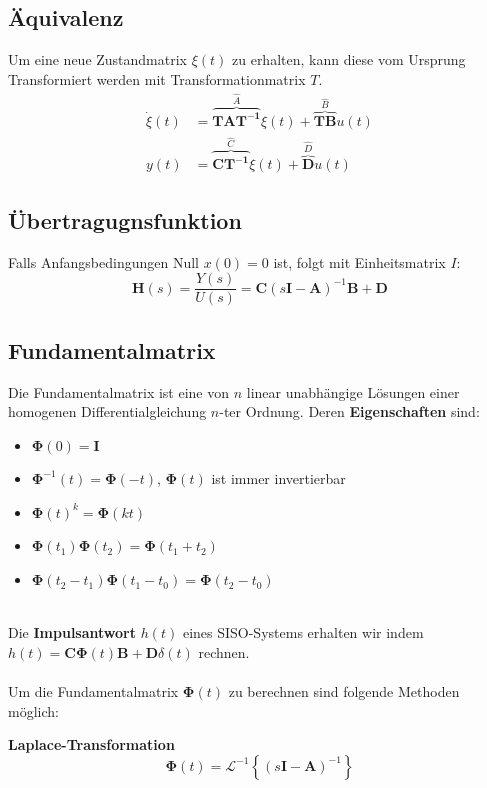 \subsection{Äquivalenz}
Um eine neue Zustandmatrix $\xi(t)$ zu erhalten, kann diese vom Ursprung Transformiert werden mit Transformationmatrix $T$.
\begin{align*}
	\dot{\xi}(t) &= \overbrace{\mathbf{TAT^{-1}}}^{\hat{A}} \xi(t) + \overbrace{\mathbf{TB}}^{\hat{B}} u(t)\\
	y(t) &= \overbrace{\mathbf{CT^{-1}}}^{\hat{C}}\xi(t) + \overbrace{\mathbf{D}}^{\hat{D}}u(t)
\end{align*}


\subsection{Übertragugnsfunktion}
Falls Anfangsbedingungen Null $x(0) = 0$ ist, folgt mit Einheitsmatrix $I$:
\[
\mathbf{H}(s) = \frac{Y(s)}{U(s)} = \mathbf{C}(s\mathbf{I} - \mathbf{A})^{-1}\mathbf{B} + \mathbf{D}
\]

\subsection{Fundamentalmatrix}
Die Fundamentalmatrix ist eine von $n$ linear unabhängige Lösungen einer homogenen Differentialgleichung $n$-ter Ordnung. Deren \textbf{Eigenschaften} sind:
\begin{itemize}[nosep]
	\item $\mathbf{\Phi}(0)  = \mathbf{I}$
	\item $\mathbf{\Phi}^{-1}(t) = \mathbf{\Phi}(-t)$, $\mathbf{\Phi}(t)$ ist immer invertierbar
	\item $\mathbf{\Phi}(t)^{k} = \mathbf{\Phi}(kt)$
	\item $\mathbf{\Phi}(t_1)\mathbf{\Phi}(t_2) = \mathbf{\Phi}(t_1 + t_2)$
	\item $\mathbf{\Phi}(t_2 - t_1)\mathbf{\Phi}(t_1 - t_0) = \mathbf{\Phi}(t_2 - t_0)$
\end{itemize}
~\\
Die \textbf{Impulsantwort} $h(t)$ eines SISO-Systems erhalten wir indem $h(t) = \mathbf{C}\mathbf{\Phi}(t)\mathbf{B} + \mathbf{D}\delta(t)$ rechnen.
~\\~\\
Um die Fundamentalmatrix $\mathbf{\Phi}(t)$ zu berechnen sind folgende Methoden möglich:


\textbf{Laplace-Transformation}
\[
\mathbf{\Phi}(t) = \mathcal{L}^{-1}\left\{(s\mathbf{I} - \mathbf{A})^{-1}\right\}
\]

